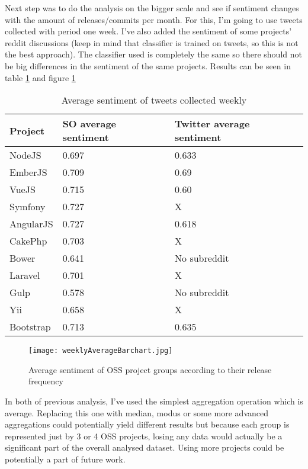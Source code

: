 
Next step was to do the analysis on the bigger scale and see if sentiment changes with the amount of releases/commits per month. For this, I'm going to use tweets collected with period one week. I've also added the sentiment of some projects' reddit discussions (keep in mind that classifier is trained on tweets, so this is not the best approach). The classifier used is completely the same so there should not be big differences in the sentiment of the same projects. Results can be seen in table \ref{table:weeklyAverageTable} and figure \ref{fig:weeklyAverageBarchart}

\begin{table}[H]
\centering
\begin{tabular}{ |p{3cm}|p{5cm}|p{5cm}}
 \hline
\textbf{Project }& \textbf{SO average sentiment} & \textbf{Twitter average sentiment}\\
 \hline
 NodeJS   & 0.697   & 0.633 \\ \hline
 EmberJS   & 0.709   & 0.69\\ \hline
 VueJS   & 0.715   & 0.60\\ \hline 
 Symfony & 0.727   & X\\ \hline   
 AngularJS   & 0.727   & 0.618\\ \hline
 CakePhp & 0.703  & X \\ \hline 
 Bower   & 0.641   & No subreddit\\ \hline 
 Laravel & 0.701   & X\\ \hline
 Gulp & 0.578   & No subreddit\\ \hline
 Yii & 0.658  & X \\ \hline
 Bootstrap & 0.713  & 0.635\\ \hline
\end{tabular}
\caption{Average sentiment of tweets collected weekly}
\label{table:weeklyAverageTable}
\end{table}


\begin{figure}[H]%
    \centering
	\texttt{[image: weeklyAverageBarchart.jpg]}
    \caption{Average sentiment of OSS project groups according to their release frequency}%
    \label{fig:weeklyAverageBarchart}%
\end{figure}

In both of previous analysis, I've used the simplest aggregation operation which is average. Replacing this one with median, modus or some more advanced aggregations could potentially yield different results but because each group is represented just by 3 or 4 OSS projects, losing any data would actually be a significant part of the overall analysed dataset. Using more projects could be potentially a part of future work.